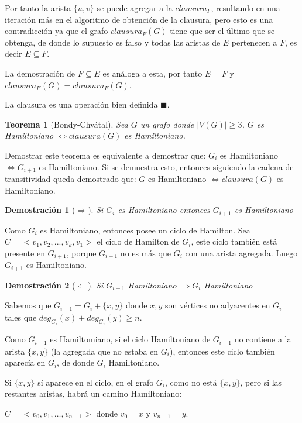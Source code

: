 \documentclass[a4paper,1pt]{report}
\newtheorem*{teo}{Teorema}
\newtheorem*{dem}{Demostración}
\begin{document}
Por tanto la arista $\{u, v\}$ se puede agregar a la $clausura_F$, resultando en una iteraci\'on m\'as en el algoritmo de obtenci\'on de la clausura, pero esto es una contradicci\'on ya que el grafo $clausura_F(G)$ tiene que ser el \'ultimo que se obtenga, de donde lo supuesto es falso y todas las aristas de $E$ pertenecen a $F$, es decir $E \subseteq F$.

La demostraci\'on de $F \subseteq E$ es an\'aloga a esta, por tanto $E = F$ y $clausura_E(G) = clausura_F(G)$.

La clausura es una operaci\'on bien definida $\blacksquare$.

\begin{teo}[Bondy-Chvátal]
    Sea $G$ un grafo donde $|V(G)|\geq 3$, $G$ es Hamiltoniano $\Leftrightarrow clausura(G)$ es Hamiltoniano.
\end{teo}

Demostrar este teorema es equivalente a demostrar que: $G_i$ es Hamiltoniano $\Leftrightarrow G_{i +1}$ es Hamiltoniano. Si se demuestra esto, entonces siguiendo la cadena de transitividad queda demostrado que: $G$ es Hamiltoniano $\Leftrightarrow clausura(G)$ es Hamiltoniano.
\begin{dem}[$\Rightarrow$] Si $G_i$ es Hamiltoniano entonces $G_{i +1}$ es Hamiltoniano\end{dem}

Como $G_i$ es Hamiltoniano, entonces posee un ciclo de Hamilton. 
Sea $C =  <v_1, v_2,..., v_k, v_1>$ el ciclo de Hamilton de $G_i$, este ciclo tambi\'en est\'a presente en $G_{i+1}$, porque $G_{i+1}$ no es m\'as que $G_i$ con una arista agregada. Luego $G_{i+1}$ es Hamiltoniano.

\begin{dem}[$\Leftarrow$] Si $G_{i+1}$ Hamiltoniano $\Rightarrow G_i$ Hamiltoniano \end{dem}

Sabemos que $G_{i+1} = G_{i} + \{x,y\}$ donde $x,y$ son v\'ertices no adyacentes en $G_i$ tales que $deg_{G_i}(x) + deg_{G_i}(y) \geq n$.

Como $G_{i+1}$ es Hamiltomiano, si el ciclo Hamiltoniano de $G_{i+1}$  no contiene a la arista $\{x,y\}$ (la agregada que no estaba en $G_i$), entonces este ciclo también aparecía en $G_i$, de donde $G_i$ Hamiltoniano.

Si $\{x,y\}$ s\'i aparece en el ciclo, en el grafo $G_i$, como no está $\{x,y\}$, pero si las restantes aristas, habrá un camino Hamiltoniano: 

$C=<v_0,v_1,\dots,v_{n-1}>$ donde $v_0=x$ y $v_{n-1}=y$.
\end{document}
